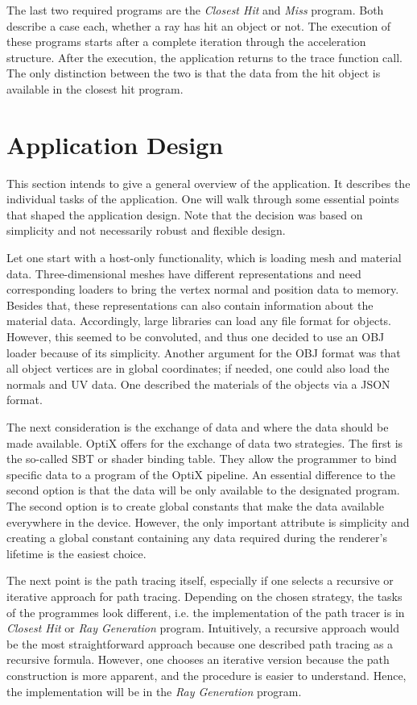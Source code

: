 The last two required programs are the \textit{Closest Hit} and \textit{Miss} program.
Both describe a case each, whether a ray has hit an object or not.
The execution of these programs starts after a complete iteration through the acceleration structure. 
After the execution, the application returns to the trace function call.
The only distinction between the two is that the data from the hit object is available in the closest hit program.

\section{Application Design}

This section intends to give a general overview of the application.
It describes the individual tasks of the application.
One will walk through some essential points that shaped the application design.
Note that the decision was based on simplicity and not necessarily robust and flexible design.

Let one start with a host-only functionality, which is loading mesh and material data.
Three-dimensional meshes have different representations and need corresponding loaders to bring the vertex normal and position data to memory.
Besides that, these representations can also contain information about the material data.
Accordingly, large libraries can load any file format for objects.
However, this seemed to be convoluted, and thus one decided to use an OBJ loader because of its simplicity. 
Another argument for the OBJ format was that all object vertices are in global coordinates; if needed, one could also load the normals and UV data.
One described the materials of the objects via a JSON format.

The next consideration is the exchange of data and where the data should be made available.
OptiX offers for the exchange of data two strategies.
The first is the so-called SBT or shader binding table.
They allow the programmer to bind specific data to a program of the OptiX pipeline.
An essential difference to the second option is that the data will be only available to the designated program.
The second option is to create global constants that make the data available everywhere in the device.
However, the only important attribute is simplicity and creating a global constant containing any data required during the renderer's lifetime is the easiest choice.

The next point is the path tracing itself, especially if one selects a recursive or iterative approach for path tracing.
Depending on the chosen strategy, the tasks of the programmes look different, i.e. the implementation of the path tracer is in \textit{Closest Hit}  or \textit{Ray Generation} program.
Intuitively, a recursive approach would be the most straightforward approach because one described path tracing as a recursive formula.
However, one chooses an iterative version because the path construction is more apparent, and the procedure is easier to understand.
Hence, the implementation will be in the \textit{Ray Generation} program.

